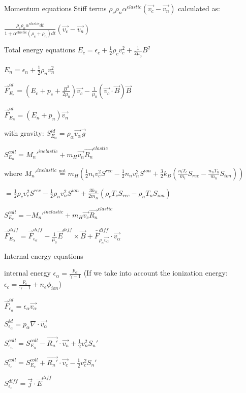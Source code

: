 \documentclass{beamer}
\begin{document}
\begin{frame}{Momentum equations}
Stiff terms $\rho_c \rho_n \alpha^{elastic} (\vec{v_c} - \vec{v_n})$ calculated as: 

$\frac{\rho_c \rho_n \alpha^{elastic} dt}{1 + \alpha^{elastic}(\rho_c + \rho_n) dt }(\vec{v_c} - \vec{v_n})$


\end{frame}
\begin{frame}{Total energy equations}
$E_c = \epsilon_c + \frac{1}{2} \rho_c v_c^2 + \frac{1}{2\mu_0} B^2$

$E_n = \epsilon_n + \frac{1}{2} \rho_n v_n^2 $

$\vec{F}_{E_{c}}^{id} = (E_c + p_c + \frac{B^2}{2 \mu_0}) \vec{v_c} - \frac{1}{\mu_0} (\vec{v_c}\cdot\vec{B}) \vec{B} $

$\vec{F}_{E_{n}}^{id} = (E_n + p_n) \vec{v_n}  $ 

with gravity: $S_{E_{\alpha}}^{id} = \rho_\alpha \vec{v_\alpha} \vec{g} $

$S_{E_{n}}^{coll}  = {M_n'}^{inelastic}+ m_H \vec{v_n} \vec{R_n}^{elastic}$

where ${M_n'}^{inelastic} \stackrel{\text{not}}{=} m_H (\frac{1}{2} n_i v_c^2 S^{rec} - \frac{1}{2} n_n v_n^2 S^{ion} + \frac{3}{2} k_B (\frac{n_i T_c}{m_i} S_{rec} - \frac{n_n T_n}{m_n} S_{ion}))$ 

$=\frac{1}{2} \rho_c v_c^2 S^{rec} - \frac{1}{2} \rho_n v_n^2 S^{ion} + \frac{3 k_B}{2 m_H}  (\rho_c T_c S_{rec} - \rho_n T_n S_{ion})$

$S_{E_{c}}^{coll} = -{M_n'}^{inelastic} + m_H \vec{v_c} \vec{R_n}^{elastic} $

$\vec{F}_{E_{\alpha}}^{diff}  = \vec{F}_{\epsilon_{\alpha}}^{diff} - \frac{1}{\mu_0} \vec{E}^{diff}  \times \vec{B} + \bar{\bar{F}}_{\rho_{n}\vec{v_\alpha}}^{diff} \cdot \vec{v_\alpha} $ 
\end{frame}

\begin{frame}{Internal energy equations}

internal energy $\epsilon_\alpha = \frac{p_\alpha}{\gamma - 1} $ (If we take into account the ionization energy: $\epsilon_c = \frac{p_c}{\gamma - 1} + n_e \phi_{ion}$)

$\vec{F}_{\epsilon_\alpha}^{id} =  \epsilon_\alpha \vec{v_\alpha}  $ 

$S_{\epsilon_{\alpha}}^{id} = p_\alpha \nabla \cdot \vec{v_\alpha} $

$S_{\epsilon_{n}}^{coll} = S_{E_{n}}^{coll} - \vec{R_n'} \cdot \vec{v_n} + \frac{1}{2} v_n^2 S_n' $ 

$S_{\epsilon_{c}}^{coll} = S_{E_{c}}^{coll} + \vec{R_n'} \cdot \vec{v_c} - \frac{1}{2} v_c^2 S_n' $ 

$S_{\epsilon_c}^{diff}  = \vec{j} \cdot \vec{E}^{diff} $ 

\end{frame}
\end{document}
